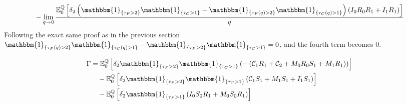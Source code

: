 \documentclass[main.tex]{subfiles}
\begin{document}
\begin{align}
            \\
            &\quad-
            \lim_{q \rightarrow 0}
            \frac{
                \mathbb{E}_{0}^{\rnmeasure}\left[
                    \delta_2
                    \left(
                        \mathbbm{1}_{\{\tau_{F}>2\}}
                        \mathbbm{1}_{\{\tau_{C}>1\}}
                        -
                        \mathbbm{1}_{\{\tau_{F}(q)>2\}}
                        \mathbbm{1}_{\{\tau_{C}(q)>1\}}
                    \right)
                    \left(
                        I_0 R_0 R_1
                        + I_1 R_1
                    \right)
                \right]
            }{
                q
            }
            \label{eqn:sharholders-value-hedged-swap-step-2}
        \end{align}
        Following the exact same proof as in the previous section $\mathbbm{1}_{\{\tau_{F}(q)>2\}}
        \mathbbm{1}_{\{\tau_{C}(q)>1\}}
        -
        \mathbbm{1}_{\{\tau_{F}>2\}}
        \mathbbm{1}_{\{\tau_{C}>1\}}
        = 0$,
        and the fourth term becomes 0.

        \begin{align}
            \Gamma &=
                \mathbb{E}_{0}^{\rnmeasure}\left[
                    \delta_2 \mathbbm{1}_{\{\tau_{F}>2\}}
                    \mathbbm{1}_{\{\tau_{C}>1\}}
                    \left(
                        -\left(\mathcal{C}_1 R_1 + \mathcal{C}_2
                        + M_0 R_0 S_1
                        + M_1 R_1\right)
                    \right)
                \right]
            \nonumber
            \\
            &\quad-
            \mathbb{E}_{0}^{\rnmeasure}\left[
                \delta_2 \mathbbm{1}_{\{\tau_{F}>2\}}
                \mathbbm{1}_{\{\tau_{C}>1\}}
                \left(
                    \mathcal{C}_{1} S_1
                    + M_1 S_1
                    + I_1 S_1
                \right)
            \right]
            \nonumber
            \\
            &\quad-
            \mathbb{E}_{0}^{\rnmeasure}\left[
                \delta_2 \mathbbm{1}_{\{\tau_{F}>1\}}
                \left(
                    I_0 S_0 R_{1}
                    + M_0 S_0 R_{1}
                \right) 
            \right]
        \end{align}
\end{document}
